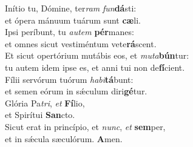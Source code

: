 \evenverse Inítio tu, Dómine, ter\textit{ram} \textit{fun}\textbf{dá}sti:~\*\\
\evenverse et ópera mánuum tuárum sunt \textbf{cæ}li.\\
\oddverse Ipsi períbunt, tu \textit{au}\textit{tem} \textbf{pér}manes:~\*\\
\oddverse et omnes sicut vestiméntum vete\textbf{rá}scent.\\
\evenverse Et sicut opertórium mutábis eos, et \textit{mu}\textit{ta}\textbf{bún}tur:~\*\\
\evenverse tu autem idem ipse es, et anni tui non de\textbf{fí}cient.\\
\oddverse Fílii servórum tuórum \textit{ha}\textit{bi}\textbf{tá}bunt:~\*\\
\oddverse et semen eórum in sǽculum diri\textbf{gé}tur.\\
\evenverse Glória Pa\textit{tri}, \textit{et} \textbf{Fí}lio,~\*\\
\evenverse et Spirítui \textbf{San}cto.\\
\oddverse Sicut erat in princípio, et \textit{nunc}, \textit{et} \textbf{sem}per,~\*\\
\oddverse et in sǽcula sæculórum. \textbf{A}men.\\
